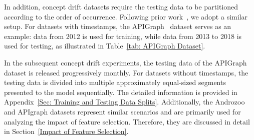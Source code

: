 \documentclass[lettersize,journal]{IEEEtran}
\begin{document}
In addition, concept drift datasets require the testing data to be partitioned according to the order of occurrence.
Following prior work~\cite{2023-Usenix-chenyizhen}, we adopt a similar setup. 
For datasets with timestamps, the APIGraph~\cite{2020-CCS-APIGraph} dataset serves as an example: data from 2012 is used for training, while data from 2013 to 2018 is used for testing, as illustrated in Table~\ref{tab: APIGraph Dataset}.
\begin{table}[h!]
	\caption{Android Concept Drift Dataset (APIGraph)}
	\label{tab: APIGraph Dataset}
	\setlength{\tabcolsep}{5.8pt}
	\begin{center}
	\end{center}
\end{table}
In the subsequent concept drift experiments, the testing data of the APIGraph dataset is released progressively monthly.
For datasets without timestamps, the testing data is divided into multiple approximately equal-sized segments presented to the model sequentially.
The detailed information is provided in Appendix~\ref{Sec: Training and Testing Data Splits}.
Additionally, the Androzoo and APIgraph datasets represent similar scenarios and are primarily used for analyzing the impact of feature selection. Therefore, they are discussed in detail in Section~\ref{Impact of Feature Selection}.
\end{document}
